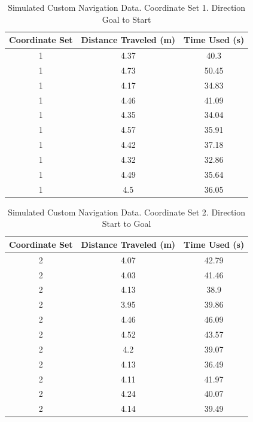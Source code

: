 \documentclass[%
paper=A4,               %
twoside=true,           %
openright,              %
11pt,                   %
bibliography=totoc,     %
titlepage=on,           %
DIV=12,                 %
BCOR=1.5cm,             %
parskip=half,            %
final
]{scrreprt}
\begin{document}
	

	\begin{table}[h!]
		\centering
		\begin{tabular}{|c|c|c|}
			\hline
			Coordinate Set & Distance Traveled (m) & Time Used (s) \\
			\hline
			1 & 4.37 & 40.3 \\
			1 & 4.73 & 50.45 \\
			1 & 4.17 & 34.83 \\
			1 & 4.46 & 41.09 \\
			1 & 4.35 & 34.04 \\
			1 & 4.57 & 35.91 \\
			1 & 4.42 & 37.18 \\
			1 & 4.32 & 32.86 \\
			1 & 4.49 & 35.64 \\
			1 & 4.5 & 36.05 \\
		\end{tabular}
		\caption{Simulated Custom Navigation Data. Coordinate Set 1. Direction Goal to Start}
		\label{tab:goal_to_start_set1}
	\end{table}
	

	
	
\begin{table}[h!]
	\centering
	\begin{tabular}{|c|c|c|}
		\hline
		Coordinate Set & Distance Traveled  (m)& Time Used (s) \\
		\hline
		2 & 4.07 & 42.79 \\
		2 & 4.03 & 41.46 \\
		2 & 4.13 & 38.9 \\
		2 & 3.95 & 39.86 \\
		2 & 4.46 & 46.09 \\
		2 & 4.52 & 43.57 \\
		2 & 4.2 & 39.07 \\
		2 & 4.13 & 36.49 \\
		2 & 4.11 & 41.97 \\
		2 & 4.24 & 40.07 \\
		2 & 4.14 & 39.49 \\
		\hline
	\end{tabular}
	\caption{Simulated Custom Navigation Data. Coordinate Set 2. Direction Start to Goal}
	\label{tab:start_to_goal_set2}
\end{table}
\end{document}
